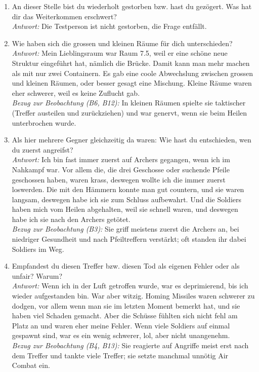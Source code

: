 \documentclass[../Main.tex]{subfiles}
\begin{document}
\begin{enumerate}[label=\textbf{I\arabic*}, leftmargin=1.5cm, itemsep=1em]
    \item An dieser Stelle bist du wiederholt gestorben bzw. hast du gezögert. Was hat dir das Weiterkommen erschwert? \\
    \textit{Antwort:} Die Testperson ist nicht gestorben, die Frage entfällt.

    \item Wie haben sich die grossen und kleinen Räume für dich unterschieden? \\
    \textit{Antwort:} Mein Lieblingsraum war Raum 7.5, weil er eine schöne neue Struktur eingeführt hat, nämlich die Brücke. Damit kann man mehr machen als mit nur zwei Containern. Es gab eine coole Abwechslung zwischen grossen und kleinen Räumen, oder besser gesagt eine Mischung. Kleine Räume waren eher schwerer, weil es keine Zuflucht gab. \\
    \textit{Bezug zur Beobachtung (B6, B12):} In kleinen Räumen spielte sie taktischer (Treffer austeilen und zurückziehen) und war genervt, wenn sie beim Heilen unterbrochen wurde.

    \item Als hier mehrere Gegner gleichzeitig da waren: Wie hast du entschieden, wen du zuerst angreifst? \\
    \textit{Antwort:} Ich bin fast immer zuerst auf Archers gegangen, wenn ich im Nahkampf war. Vor allem die, die drei Geschosse oder suchende Pfeile geschossen haben, waren krass, deswegen wollte ich die immer zuerst loswerden. Die mit den Hämmern konnte man gut countern, und sie waren langsam, deswegen habe ich sie zum Schluss aufbewahrt. Und die Soldiers haben mich vom Heilen abgehalten, weil sie schnell waren, und deswegen habe ich sie nach den Archers getötet. \\
    \textit{Bezug zur Beobachtung (B3):} Sie griff meistens zuerst die Archers an, bei niedriger Gesundheit und nach Pfeiltreffern verstärkt; oft standen ihr dabei Soldiers im Weg.

    \item Empfandest du diesen Treffer bzw. diesen Tod als eigenen Fehler oder als unfair? Warum? \\
    \textit{Antwort:} Wenn ich in der Luft getroffen wurde, war es deprimierend, bis ich wieder aufgestanden bin. War aber witzig. Homing Missiles waren schwerer zu dodgen, vor allem wenn man sie im letzten Moment bemerkt hat, und sie haben viel Schaden gemacht. Aber die Schüsse fühlten sich nicht fehl am Platz an und waren eher meine Fehler. Wenn viele Soldiers auf einmal gespawnt sind, war es ein wenig schwerer, lol, aber nicht unangenehm. \\
    \textit{Bezug zur Beobachtung (B4, B13):} Sie reagierte auf Angriffe meist erst nach dem Treffer und tankte viele Treffer; sie setzte manchmal unnötig Air Combat ein.


\end{enumerate}
\end{document}
